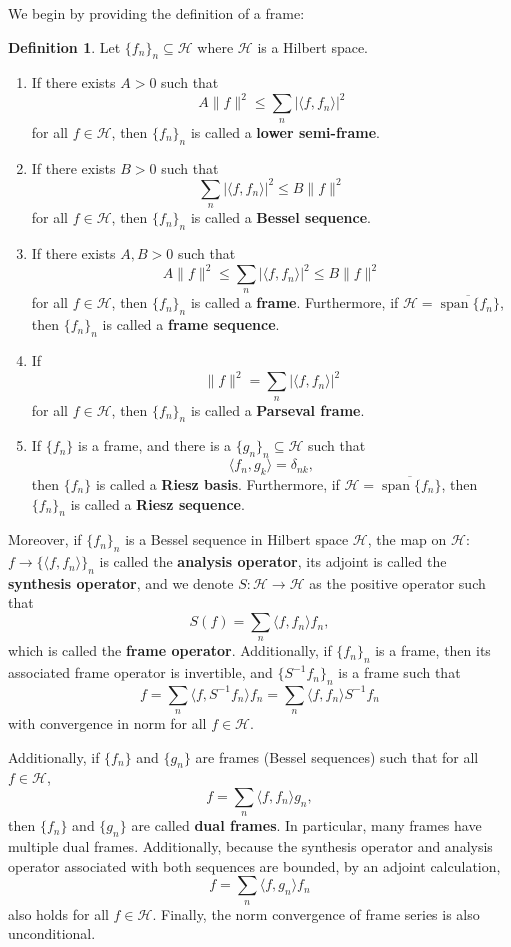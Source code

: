 \documentclass[11pt]{amsart}
\theoremstyle{definition}
\newtheorem{def_n}[thm]{Definition}
\numberwithin{equation}{section}
\newcommand{\Hcal}{\mathcal{H}} %
\begin{document}
We begin by providing the definition of a frame:
\begin{def_n}
Let $\{f_{n}\}_{n}\subseteq \Hcal$ where $\Hcal$ is a Hilbert space.
\begin{enumerate}
\item If there exists $A>0$ such that
$$A\|f\|^{2}\leq \sum_{n}|\langle f, f_{n}\rangle|^{2}$$
for all $f\in \Hcal$, then $\{f_{n}\}_{n}$ is called a \textbf{lower semi-frame}.
\item If there exists $B>0$ such that
$$\sum_{n}|\langle f, f_{n}\rangle|^{2}\leq B\|f\|^{2}$$
for all $f\in \Hcal$, then $\{f_{n}\}_{n}$ is called a \textbf{Bessel sequence}.
\item If there exists $A,B>0$ such that
    $$A\|f\|^{2}\leq \sum_{n}|\langle f, f_{n}\rangle|^{2}\leq B\|f\|^{2}$$
    for all $f\in \Hcal$, then $\{f_{n}\}_{n}$ is called a \textbf{frame}. Furthermore, if $\Hcal=\overline{\operatorname{span}\{f_n\}}$, then $\{f_{n}\}_{n}$ is called a \textbf{frame sequence}.
\item If
$$\|f\|^{2}=\sum_{n}|\langle f, f_{n}\rangle|^{2}$$
for all $f\in \Hcal$, then $\{f_{n}\}_{n}$ is called a \textbf{Parseval frame}.
\item If $\{f_{n}\}$ is a frame, and there is a $\{g_{n}\}_{n}\subseteq \Hcal$ such that
$$\langle f_n,g_k\rangle=\delta_{nk},$$then $\{f_{n}\}$ is called a \textbf{Riesz basis}. Furthermore, if $\Hcal=\overline{\operatorname{span}\{f_n\}}$, then $\{f_{n}\}_{n}$ is called a \textbf{Riesz sequence}.
\end{enumerate}
Moreover, if $\{f_{n}\}_{n}$ is a Bessel sequence in Hilbert space $\Hcal$,
the map on $\Hcal$: $f\to \{\langle f, f_{n}\rangle \}_{n}$ is called the \textbf{analysis operator}, its adjoint is called the \textbf{synthesis operator}, and 
we denote $S: \Hcal\to \Hcal$ as the positive operator such that
$$S(f)=\sum_{n}\langle f, f_{n}\rangle f_{n},$$ which is called the \textbf{frame operator}.
Additionally, if $\{f_{n}\}_{n}$ is a frame, then its associated frame operator is invertible, and $\{S^{-1}f_{n}\}_{n}$ is a frame such that
$$f=\sum_{n}\langle f, S^{-1}f_{n}\rangle f_{n}=\sum_{n}\langle f, f_{n}\rangle S^{-1}f_{n}$$ with convergence in norm for all $f\in \Hcal$.

Additionally, if $\{f_{n}\}$ and $\{g_{n}\}$ are frames (Bessel sequences) such that for all $f\in \Hcal$,
$$f=\sum_{n}\langle f, f_{n}\rangle g_{n},$$ then $\{f_{n}\}$ and $\{g_{n}\}$ are called \textbf{dual frames}. In particular, many frames have multiple dual frames. Additionally, because the synthesis operator and analysis operator associated with both sequences are bounded, by an adjoint calculation, 
$$f=\sum_{n}\langle f,g_{n}\rangle f_{n}$$ also holds for all $f\in \Hcal$. Finally, the norm convergence of frame series is also unconditional.
\end{def_n}
\end{document}
